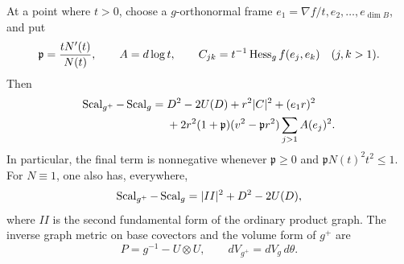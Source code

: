 \begin{proposition}\label{prop:scalar-update}
At a point where $t>0$, choose a $g$-orthonormal frame
$e_1=\nabla f/t,e_2,\ldots,e_{\dim B}$, and put
\[
 \mathfrak p=\frac{tN'(t)}{N(t)},\qquad
 A=d\log t,\qquad
 C_{jk}=t^{-1}\operatorname{Hess}_g f(e_j,e_k)\quad(j,k>1).
\]
Then
\begin{equation}\label{eq:scalar-exact}
 \begin{split}
 \operatorname{Scal}_{g^+}-\operatorname{Scal}_g
 ={}&D^2-2U(D)+r^2\lvert C\rvert^2+(e_1r)^2\\
 &+2r^2(1+\mathfrak p)(v^2-\mathfrak p r^2)
       \sum_{j>1}A(e_j)^2.
 \end{split}
\end{equation}
In particular, the final term is nonnegative whenever
$\mathfrak p\ge0$ and $\mathfrak p N(t)^2t^2\le1$.
For $N\equiv1$, one also has, everywhere,
\begin{equation}\label{eq:ordinary-scalar-update}
 \operatorname{Scal}_{g^+}-\operatorname{Scal}_g=\lvert II\rvert^2+D^2-2U(D),
\end{equation}
where $II$ is the second fundamental form of the ordinary product graph.
The inverse graph metric on base covectors and the volume form of $g^+$ are
\begin{equation}\label{eq:graph-inverse-volume}
 P=g^{-1}-U\otimes U,
 \qquad dV_{g^+}=dV_g\,d\theta.
\end{equation}
\end{proposition}

